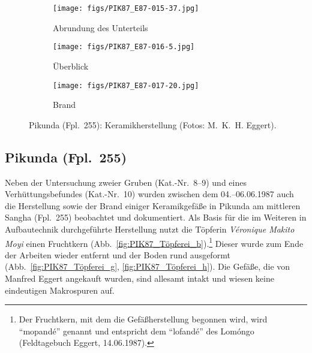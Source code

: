 \begin{figure*}[p]
\begin{subfigure}[t]{0.32\textwidth}
		\centering
		\texttt{[image: figs/PIK87\_E87-015-37.jpg]}
		\caption{Abrundung des Unterteils}
		\label{fig:PIK87_Töpferei_j}
	\end{subfigure}
	\begin{subfigure}[t]{0.32\textwidth}
		\centering
		\texttt{[image: figs/PIK87\_E87-016-5.jpg]}
		\caption{Überblick}
		\label{fig:PIK87_Töpferei_k}
	\end{subfigure}
	\begin{subfigure}[t]{0.32\textwidth}
		\centering
		\texttt{[image: figs/PIK87\_E87-017-20.jpg]}
		\caption{Brand}
		\label{fig:PIK87_Töpferei_l}
	\end{subfigure}
	\caption{Pikunda (Fpl.~255): Keramikherstellung (Fotos: M.~K.~H. Eggert).}
	\label{fig:PIK87_Töpferei}
\end{figure*}

\subsection*{Pikunda (Fpl.~255)}\label{sec:PIK_Herstellung}

Neben der Untersuchung zweier Gruben (Kat.-Nr.~8--9) und eines Verhüttungsbefundes (Kat.-Nr.~10) wurden zwischen dem 04.--06.06.1987 auch die Herstellung sowie der Brand einiger Keramikgefäße in Pikunda am mittleren Sangha (Fpl.~255) beobachtet und dokumentiert. Als Basis für die im Weiteren in Aufbautechnik durchgeführte Herstellung nutzt die Töpferin \textit{Véronique Makito Moyi} einen Fruchtkern (Abb.~\ref{fig:PIK87_Töpferei_b}).\footnote{Der Fruchtkern, mit dem die Gefäßherstellung begonnen wird, wird \enquote{mopandé} genannt und entspricht dem \enquote{lofandé} des Lomóngo (Feldtagebuch Eggert, 14.06.1987).} Dieser wurde zum Ende der Arbeiten wieder entfernt und der Boden rund ausgeformt (Abb.~\ref{fig:PIK87_Töpferei_g}, \ref{fig:PIK87_Töpferei_h}). Die Gefäße, die von Manfred Eggert angekauft wurden, sind allesamt intakt und wiesen keine eindeutigen Makrospuren auf. 


